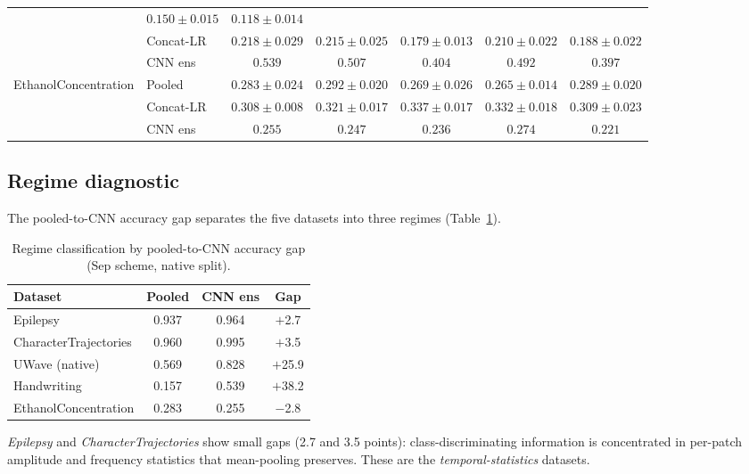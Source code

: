 \documentclass[conference,compsoc]{IEEEtran}
\begin{document}
\begin{table}[t]
\begin{tabular}{llccccc}
               & $0.150 \pm 0.015$ & $0.118 \pm 0.014$ \\
  & Concat-LR & $0.218 \pm 0.029$ & $0.215 \pm 0.025$ & $0.179 \pm 0.013$
               & $0.210 \pm 0.022$ & $0.188 \pm 0.022$ \\
  & CNN ens   & $\mathbf{0.539}$  & $0.507$           & $0.404$
               & $0.492$           & $0.397$           \\
\midrule
\multirow{3}{*}{EthanolConcentration}
  & Pooled    & $0.283 \pm 0.024$ & $0.292 \pm 0.020$ & $0.269 \pm 0.026$
               & $0.265 \pm 0.014$ & $0.289 \pm 0.020$ \\
  & Concat-LR & $0.308 \pm 0.008$ & $0.321 \pm 0.017$ & $0.337 \pm 0.017$
               & $0.332 \pm 0.018$ & $0.309 \pm 0.023$ \\
  & CNN ens   & $0.255$           & $0.247$           & $0.236$
               & $\mathbf{0.274}$  & $0.221$           \\
\bottomrule
\end{tabular}
\end{table}

\subsection{Regime diagnostic}
\label{sec:regime}

The pooled-to-CNN accuracy gap separates the five datasets into three
regimes (Table~\ref{tab:regime}).

\begin{table}[t]
\caption{Regime classification by pooled-to-CNN accuracy gap
(Sep scheme, native split).}
\label{tab:regime}
\centering
\begin{tabular}{lccc}
\toprule
Dataset & Pooled & CNN ens & Gap \\
\midrule
Epilepsy              & 0.937 & 0.964 & $+$2.7 \\
CharacterTrajectories & 0.960 & 0.995 & $+$3.5 \\
\midrule
UWave (native)        & 0.569 & 0.828 & $+$25.9 \\
Handwriting           & 0.157 & 0.539 & $+$38.2 \\
\midrule
EthanolConcentration  & 0.283 & 0.255 & $-$2.8 \\
\bottomrule
\end{tabular}
\end{table}

\textit{Epilepsy} and \textit{CharacterTrajectories} show small gaps
(2.7 and 3.5 points): class-discriminating information is concentrated
in per-patch amplitude and frequency statistics that mean-pooling
preserves.
These are the \textit{temporal-statistics} datasets.
\end{document}
